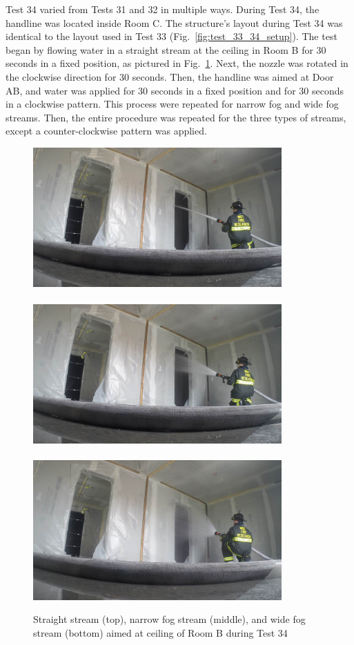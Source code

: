 \documentclass[12pt,oneside]{book}
\begin{document}
Test 34 varied from Tests 31 and 32 in multiple ways. During Test 34, the handline was located inside Room C. The structure's layout during Test 34 was identical to the layout used in Test 33 (Fig.~\ref{fig:test_33_34_setup}). The test began by flowing water in a straight stream at the ceiling in Room B for 30 seconds in a fixed position, as pictured in Fig.~\ref{fig:test_34_pic}. Next, the nozzle was rotated in the clockwise direction for 30 seconds. Then, the handline was aimed at Door AB, and water was applied for 30 seconds in a fixed position and for 30 seconds in a clockwise pattern. This process were repeated for narrow fog and wide fog streams. Then, the entire procedure was repeated for the three types of streams, except a counter-clockwise pattern was applied.

\begin{figure}[!ht]
\includegraphics[trim=23cm 6.5cm 4cm 6cm, clip=true, width=3.75in]{../Pictures/SS_Room_B_Test_34}
\\~\\
\includegraphics[trim=23cm 6.5cm 4cm 6cm, clip=true, width=3.75in]{../Pictures/NF_Room_B_Test_34}
\\~\\
\includegraphics[trim=23cm 6.5cm 4cm 6cm, clip=true, width=3.75in]{../Pictures/WF_Room_B_Test_34}
\caption[Straight Stream, Narrow Fog Stream, and Wide Fog Stream during Test 34]{Straight stream (top), narrow fog stream (middle), and wide fog stream (bottom) aimed at ceiling of Room B during Test 34}
\label{fig:test_34_pic}
\end{figure}
\FloatBarrier
\end{document}
